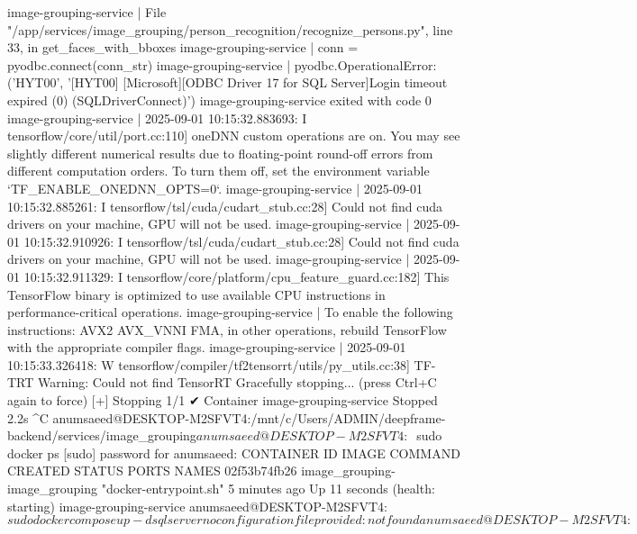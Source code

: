 image-grouping-service  |   File "/app/services/image_grouping/person_recognition/recognize_persons.py", line 33, in get_faces_with_bboxes
image-grouping-service  |     conn = pyodbc.connect(conn_str)
image-grouping-service  | pyodbc.OperationalError: ('HYT00', '[HYT00] [Microsoft][ODBC Driver 17 for SQL Server]Login timeout expired (0) (SQLDriverConnect)')
image-grouping-service exited with code 0
image-grouping-service  | 2025-09-01 10:15:32.883693: I tensorflow/core/util/port.cc:110] oneDNN custom operations are on. You may see slightly different numerical results due to floating-point round-off errors from different computation orders. To turn them off, set the environment variable `TF_ENABLE_ONEDNN_OPTS=0`.
image-grouping-service  | 2025-09-01 10:15:32.885261: I tensorflow/tsl/cuda/cudart_stub.cc:28] Could not find cuda drivers on your machine, GPU will not be used.
image-grouping-service  | 2025-09-01 10:15:32.910926: I tensorflow/tsl/cuda/cudart_stub.cc:28] Could not find cuda drivers on your machine, GPU will not be used.
image-grouping-service  | 2025-09-01 10:15:32.911329: I tensorflow/core/platform/cpu_feature_guard.cc:182] This TensorFlow binary is optimized to use available CPU instructions in performance-critical operations.
image-grouping-service  | To enable the following instructions: AVX2 AVX_VNNI FMA, in other operations, rebuild TensorFlow with the appropriate compiler flags.
image-grouping-service  | 2025-09-01 10:15:33.326418: W tensorflow/compiler/tf2tensorrt/utils/py_utils.cc:38] TF-TRT Warning: Could not find TensorRT
Gracefully stopping... (press Ctrl+C again to force)
[+] Stopping 1/1
 ✔ Container image-grouping-service  Stopped                                                                                                   2.2s
^C
anumsaeed@DESKTOP-M2SFVT4:/mnt/c/Users/ADMIN/deepframe-backend/services/image_grouping$










anumsaeed@DESKTOP-M2SFVT4:~$ sudo docker ps
[sudo] password for anumsaeed:
CONTAINER ID   IMAGE                           COMMAND                  CREATED         STATUS                             PORTS     NAMES
02f53b74fb26   image_grouping-image_grouping   "docker-entrypoint.sh"   5 minutes ago   Up 11 seconds (health: starting)             image-grouping-service
anumsaeed@DESKTOP-M2SFVT4:~$ sudo docker compose up -d sqlserver
no configuration file provided: not found
anumsaeed@DESKTOP-M2SFVT4:~$







